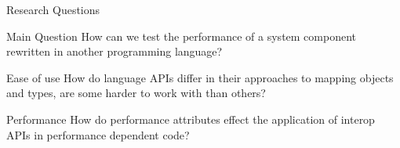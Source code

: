 
\begin{frame}{Research Questions}
    \begin{block}{Main Question}
        How can we test the performance of a system component rewritten in another programming language?
    \end{block}

    \pause

    \begin{block}{Ease of use}
        How do language APIs differ in their approaches to mapping objects and types, are some harder to work with than others?
    \end{block}

    \pause

    \begin{block}{Performance}
        How do performance attributes effect the application of interop APIs in performance dependent code?
    \end{block}

\end{frame}
